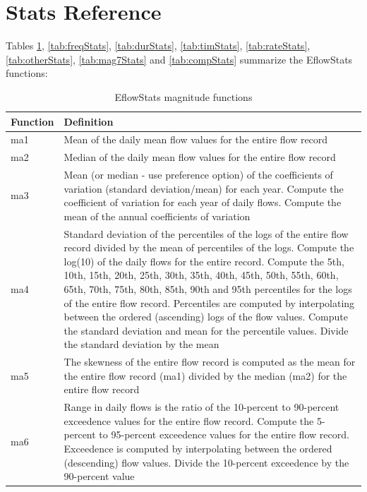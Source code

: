 \documentclass[a4paper,11pt]{article}\usepackage[]{graphicx}\usepackage[]{color}
\begin{document}
\section{Stats Reference}
\label{sec:reference}

Tables \ref{tab:magStats}, \ref{tab:freqStats}, \ref{tab:durStats}, \ref{tab:timStats}, \ref{tab:rateStats}, \ref{tab:otherStats}, \ref{tab:mag7Stats} and \ref{tab:compStats} summarize the EflowStats functions:

\begin{table}[{|l|X|}[ht]
  \centering
  \begin{threeparttable}[b]
  \caption{EflowStats magnitude functions}
  \label{tab:magStats}
  \begin{tabularx}{\textwidth}{|l|X|}
  \hline
\textbf{Function} & \textbf{Definition} \\ 
  \hline\hline
  ma1 & Mean of the daily mean flow values for the entire flow record \\
  ma2 & Median of the daily mean flow values for the entire flow record \\
  ma3 & Mean (or median - use preference option) of the coefficients of 
  variation (standard deviation/mean) for each year. Compute the coefficient 
  of variation for each year of daily flows. Compute the mean of the annual 
  coefficients of variation \\
  ma4 & Standard deviation of the percentiles of the logs of the entire flow record divided by the mean of percentiles of the logs. Compute the log(10) of the daily flows for the entire record. Compute the 5th, 10th, 15th, 20th, 25th, 30th, 35th, 40th, 45th, 50th, 55th, 60th, 65th, 70th, 75th, 80th, 85th, 90th and 95th percentiles for the logs of the entire flow record. Percentiles are computed by interpolating between the ordered (ascending) logs of the flow values. Compute the standard deviation and mean for the percentile values. Divide the standard deviation by the mean \\
  ma5 & The skewness of the entire flow record is computed as the mean for the entire flow record (ma1) divided by the median (ma2) for the entire flow record \\
  ma6 & Range in daily flows is the ratio of the 10-percent to 90-percent exceedence values for the entire flow record. Compute the 5-percent to 95-percent exceedence values for the entire flow record. Exceedence is computed by interpolating between the ordered (descending) flow values. Divide the 10-percent exceedence by the 90-percent value \\

\end{tabularx}
\end{threeparttable}
\end{table}
\end{document}
